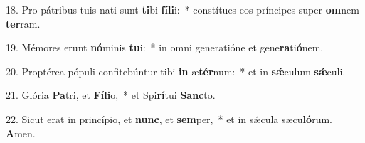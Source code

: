18. Pro pátribus tuis nati sunt \textbf{ti}bi \textbf{fí}\textbf{li}i:~*  constítues eos príncipes super \textbf{om}nem \textbf{ter}ram.\

19. Mémores erunt \textbf{nó}minis \textbf{tu}i:~*  in omni generatióne et gene\textbf{ra}ti\textbf{ó}nem.\

20. Proptérea pópuli confitebúntur tibi \textbf{in} æ\textbf{tér}num:~*  et in \textbf{sǽ}culum \textbf{sǽ}culi.\

21. Glória \textbf{Pa}tri, et \textbf{Fí}\textbf{li}o,~*  et Spi\textbf{rí}tui \textbf{Sanc}to.\

22. Sicut erat in princípio, et \textbf{nunc}, et \textbf{sem}per,~*  et in sǽcula sæcu\textbf{ló}rum. \textbf{A}men.\

